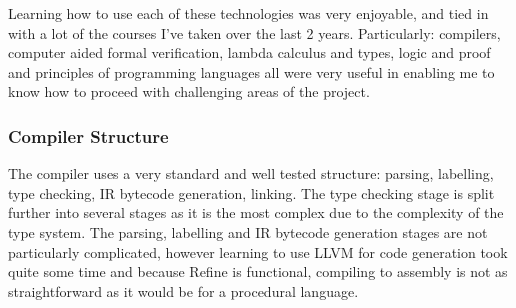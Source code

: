 \bigskip

Learning how to use each of these technologies was very enjoyable, and tied in with a lot of the
courses I've taken over the last 2 years.
Particularly: compilers, computer aided formal verification, lambda calculus and types, logic and proof
and principles of programming languages all were very useful in enabling me to know how to proceed
with challenging areas of the project.

\subsubsection{Compiler Structure}

The compiler uses a very standard and well tested structure: parsing, labelling, type checking,
IR bytecode generation, linking.
The type checking stage is split further into several stages as it is the most complex due to the
complexity of the type system.
The parsing, labelling and IR bytecode generation stages are not particularly complicated, however
learning to use LLVM for code generation took quite some time and because Refine is functional,
compiling to assembly is not as straightforward as it would be for a procedural language.
